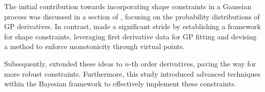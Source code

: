 

The initial contribution towards incorporating shape constraints in a Gaussian process was discussed in a section of \cite{Rasmussen2005}, focusing on the probability distributions of GP derivatives.
In contrast, \cite{Riihimaki2010} made a significant stride by establishing a framework for shape constraints, leveraging first derivative data for GP fitting and devising a method to enforce monotonicity through virtual points.

Subsequently, \cite{Berger2016} extended these ideas to $n$-th order derivatives, paving the way for more robust constraints.
Furthermore, this study introduced advanced techniques within the Bayesian framework to effectively implement these constraints.



